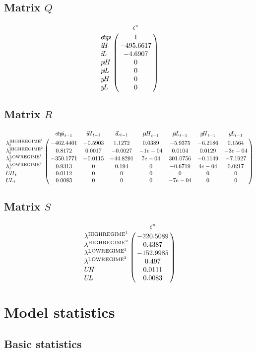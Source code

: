 \subsection*{Matrix $Q$}

$$\bordermatrix{
~ & \epsilon^{\pi} \cr
{e\!t\!a\!p\!i} & 1 \cr
{i\!H} & -495.6617 \cr
{i\!L} & -4.6907 \cr
{p\!i\!H} & 0 \cr
{p\!i\!L} & 0 \cr
{y\!H} & 0 \cr
{y\!L} & 0 \cr
}$$

\subsection*{Matrix $R$}

$$\bordermatrix{
~ & {e\!t\!a\!p\!i}_{t-1} & {i\!H}_{t-1} & {i\!L}_{t-1} & {p\!i\!H}_{t-1} & {p\!i\!L}_{t-1} & {y\!H}_{t-1} & {y\!L}_{t-1} \cr
\lambda^{\mathrm{HIGHREGIME}^{\mathrm{1}}}_{t} & -462.4401 & -0.5903 & 1.1272 & 0.0389 & -5.9375 & -6.2186 & 0.1564 \cr
\lambda^{\mathrm{HIGHREGIME}^{\mathrm{2}}}_{t} & 0.8172 & 0.0017 & -0.0027 & -1e-04 & 0.0104 & 0.0129 & -3e-04 \cr
\lambda^{\mathrm{LOWREGIME}^{\mathrm{1}}}_{t} & -350.1771 & -0.0115 & -44.8291 & 7e-04 & 301.0756 & -0.1149 & -7.1927 \cr
\lambda^{\mathrm{LOWREGIME}^{\mathrm{2}}}_{t} & 0.9313 & 0 & 0.194 & 0 & -0.6719 & 4e-04 & 0.0217 \cr
{U\!H}_{t} & 0.0112 & 0 & 0 & 0 & 0 & 0 & 0 \cr
{U\!L}_{t} & 0.0083 & 0 & 0 & 0 & -7e-04 & 0 & 0 \cr
}$$

\subsection*{Matrix $S$}

$$\bordermatrix{
~ & \epsilon^{\pi} \cr
\lambda^{\mathrm{HIGHREGIME}^{\mathrm{1}}} & -220.5089 \cr
\lambda^{\mathrm{HIGHREGIME}^{\mathrm{2}}} & 0.4387 \cr
\lambda^{\mathrm{LOWREGIME}^{\mathrm{1}}} & -152.9985 \cr
\lambda^{\mathrm{LOWREGIME}^{\mathrm{2}}} & 0.497 \cr
{U\!H} & 0.0111 \cr
{U\!L} & 0.0083 \cr
}$$


\section{Model statistics}

\subsection{Basic statistics}

